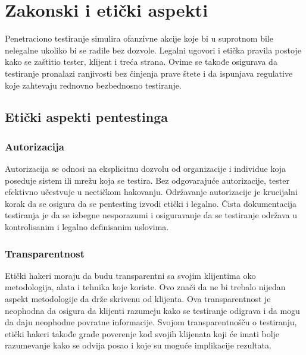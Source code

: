 \documentclass[a4paper,12pt]{article}
\begin{document}
\begin{itemize}
\begin{itemize}
  \end{itemize}
\end{itemize}
\section{Zakonski i etički aspekti}
Penetraciono testiranje simulira ofanzivne akcije koje bi u suprotnom bile nelegalne ukoliko bi se radile bez dozvole. Legalni ugovori i etička pravila postoje kako se zaštitio tester, klijent i treća strana. Ovime se takođe osigurava da testiranje pronalazi ranjivosti bez činjenja prave štete i da ispunjava regulative koje zahtevaju rednovno bezbednosno testiranje. 

\subsection{Etički aspekti pentestinga}
\subsubsection*{Autorizacija} 
Autorizacija se odnosi na eksplicitnu dozvolu od organizacije i individue koja poseduje sistem ili mrežu koja se testira. Bez odgovarajuće autorizacije, tester efektivno učestvuje u neetičkom hakovanju. Održavanje autorizacije je krucijalni korak da se osigura da se pentesting izvodi etički i legalno. Čista dokumentacija testiranja je da se izbegne nesporazumi i osiguravanje da se testiranje održava u kontrolisanim i legalno definisanim uslovima.\cite{ethical-legal-pentesting}

\subsubsection*{Transparentnost} 
Etički hakeri moraju da budu transparentni sa svojim klijentima oko metodologija, alata i tehnika koje koriste. Ovo znači da ne bi trebalo nijedan aspekt metodologije da drže skrivenu od klijenta. Ova transparentnost je neophodna da osigura da klijenti razumeju kako se testiranje odigrava i da mogu da daju neophodne povratne informacije. Svojom transparentnošču o testiranju, etički hakeri takođe grade poverenje kod svojih klijenata koji će imati bolje razumevanje kako se odvija posao i koje su moguće implikacije rezultata. \cite{ethical-legal-pentesting}
\end{document}

